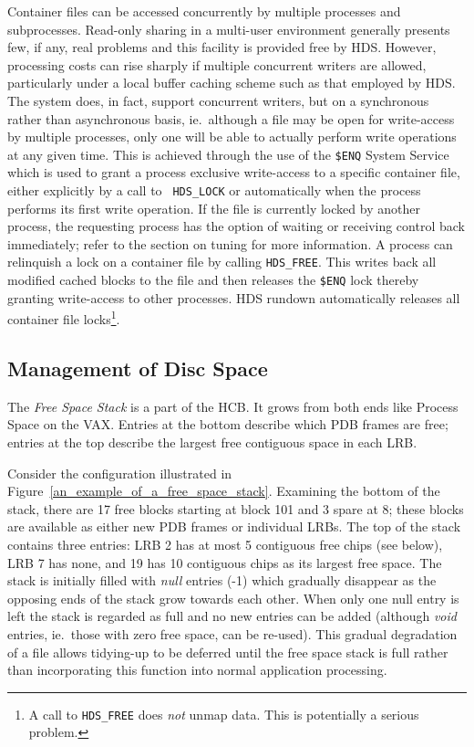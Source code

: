 Container files can be accessed concurrently by multiple processes and
subprocesses. Read-only sharing in a multi-user environment generally presents
few, if any, real problems and this facility is provided free by HDS. However,
processing costs can rise sharply if multiple concurrent writers are allowed,
particularly under a local buffer caching scheme such as that employed by HDS.
The system does, in fact, support concurrent writers, but on a synchronous
rather than asynchronous basis, ie.\ although a file may be open for
write-access by multiple processes, only one will be able to actually perform
write operations at any given time. This is achieved through the use of the
{\tt \$ENQ} System Service which is used to grant a process exclusive
write-access to a specific container file, either explicitly by a call to {\tt
HDS\_LOCK} or automatically when the process performs its first write
operation. If the file is currently locked by another process, the requesting
process has the option of waiting or receiving control back immediately; refer
to the section on tuning for more information. A process can relinquish a lock
on a container file by calling {\tt HDS\_FREE}. This writes back all modified
cached blocks to the file and then releases the {\tt \$ENQ} lock thereby
granting write-access to other processes. HDS rundown automatically releases
all container file locks\footnote{A call to {\tt HDS\_FREE} does {\em not}
unmap data. This is potentially a serious problem.}.

\subsection {Management of Disc Space}
\label {disc_space_management}

The {\em Free Space Stack} is a part of the HCB. It grows from both ends like
Process Space on the VAX. Entries at the bottom describe which  PDB frames are
free; entries at the top describe the largest free contiguous space in each LRB.

Consider the configuration illustrated in
Figure~\ref{an_example_of_a_free_space_stack}. Examining the bottom of the
stack, there are 17 free blocks starting at block 101 and 3 spare at 8; these
blocks are available as either new PDB frames or individual LRBs. The top of the
stack contains three entries: LRB 2 has at most 5 contiguous free chips (see
below), LRB 7 has none, and 19 has 10 contiguous chips as its largest free
space. The stack is initially filled with {\em null} entries (-1) which
gradually disappear as the opposing ends of the stack grow towards each other.
When only one null entry is left the stack is regarded as full and no new
entries can be added (although {\em void} entries, ie.\ those with zero free
space, can be re-used). This gradual degradation of a file allows tidying-up to
be deferred until the free space stack is full rather than incorporating this
function into normal application processing.

